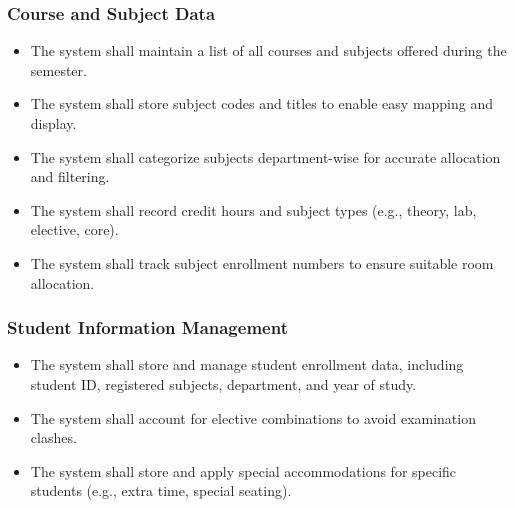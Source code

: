 \documentclass[a4paper,12pt]{article}
\begin{document}










\subsubsection{Course and Subject Data}
\begin{itemize}
\item The system shall maintain a list of all courses and subjects offered during the semester.

\item The system shall store subject codes and titles to enable easy mapping and display.

\item The system shall categorize subjects department-wise for accurate allocation and filtering.

\item The system shall record credit hours and subject types (e.g., theory, lab, elective, core).

\item The system shall track subject enrollment numbers to ensure suitable room allocation.
\end{itemize}

\subsubsection{Student Information Management}
\begin{itemize}
\item The system shall store and manage student enrollment data, including student ID, registered subjects, department, and year of study.

\item The system shall account for elective combinations to avoid examination clashes.

\item The system shall store and apply special accommodations for specific students (e.g., extra time, special seating).
\end{itemize}
\end{document}
